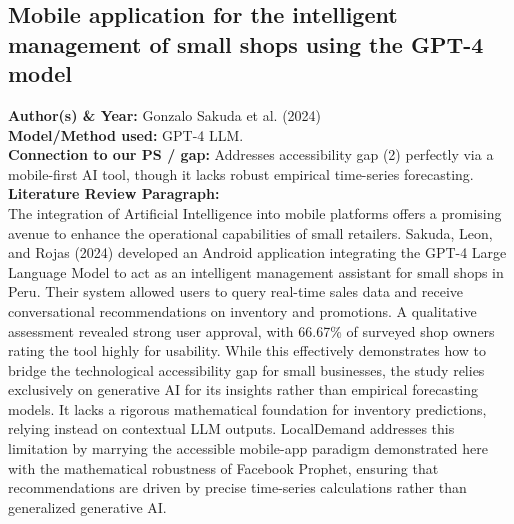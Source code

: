\documentclass[conference]{IEEEtran}
\begin{document}
\subsection{Mobile application for the intelligent management of small shops using the GPT-4 model}
\textbf{Author(s) \& Year:} Gonzalo Sakuda et al. (2024)\\
\textbf{Model/Method used:} GPT-4 LLM.\\
\textbf{Connection to our PS / gap:} Addresses accessibility gap (2) perfectly via a mobile-first AI tool, though it lacks robust empirical time-series forecasting.\\
\textbf{Literature Review Paragraph:}\\
The integration of Artificial Intelligence into mobile platforms offers a promising avenue to enhance the operational capabilities of small retailers. Sakuda, Leon, and Rojas (2024) developed an Android application integrating the GPT-4 Large Language Model to act as an intelligent management assistant for small shops in Peru. Their system allowed users to query real-time sales data and receive conversational recommendations on inventory and promotions. A qualitative assessment revealed strong user approval, with 66.67\% of surveyed shop owners rating the tool highly for usability. While this effectively demonstrates how to bridge the technological accessibility gap for small businesses, the study relies exclusively on generative AI for its insights rather than empirical forecasting models. It lacks a rigorous mathematical foundation for inventory predictions, relying instead on contextual LLM outputs. LocalDemand addresses this limitation by marrying the accessible mobile-app paradigm demonstrated here with the mathematical robustness of Facebook Prophet, ensuring that recommendations are driven by precise time-series calculations rather than generalized generative AI.
\end{document}
